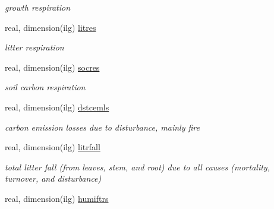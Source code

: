 \begin{DoxyCompactItemize}
\begin{DoxyCompactList}\small\item\em growth respiration \end{DoxyCompactList}\item 
\hypertarget{structctem__statevars_1_1veg__gat_a3fc69379e71240c591774478841c9e20}{}real, dimension(ilg) \hyperlink{structctem__statevars_1_1veg__gat_a3fc69379e71240c591774478841c9e20}{litres}\label{structctem__statevars_1_1veg__gat_a3fc69379e71240c591774478841c9e20}

\begin{DoxyCompactList}\small\item\em litter respiration \end{DoxyCompactList}\item 
\hypertarget{structctem__statevars_1_1veg__gat_a324309f92e7e12ee6d29fe12695d1551}{}real, dimension(ilg) \hyperlink{structctem__statevars_1_1veg__gat_a324309f92e7e12ee6d29fe12695d1551}{socres}\label{structctem__statevars_1_1veg__gat_a324309f92e7e12ee6d29fe12695d1551}

\begin{DoxyCompactList}\small\item\em soil carbon respiration \end{DoxyCompactList}\item 
\hypertarget{structctem__statevars_1_1veg__gat_a52847b9c68479f3122a9c032b7e5f507}{}real, dimension(ilg) \hyperlink{structctem__statevars_1_1veg__gat_a52847b9c68479f3122a9c032b7e5f507}{dstcemls}\label{structctem__statevars_1_1veg__gat_a52847b9c68479f3122a9c032b7e5f507}

\begin{DoxyCompactList}\small\item\em carbon emission losses due to disturbance, mainly fire \end{DoxyCompactList}\item 
\hypertarget{structctem__statevars_1_1veg__gat_a190e5aec014b2f91420e7d740fcad2b2}{}real, dimension(ilg) \hyperlink{structctem__statevars_1_1veg__gat_a190e5aec014b2f91420e7d740fcad2b2}{litrfall}\label{structctem__statevars_1_1veg__gat_a190e5aec014b2f91420e7d740fcad2b2}

\begin{DoxyCompactList}\small\item\em total litter fall (from leaves, stem, and root) due to all causes (mortality, turnover, and disturbance) \end{DoxyCompactList}\item 
\hypertarget{structctem__statevars_1_1veg__gat_a72636a3771b5bbe07ba49278bf48faba}{}real, dimension(ilg) \hyperlink{structctem__statevars_1_1veg__gat_a72636a3771b5bbe07ba49278bf48faba}{humiftrs}\label{structctem__statevars_1_1veg__gat_a72636a3771b5bbe07ba49278bf48faba}


\end{DoxyCompactItemize}
